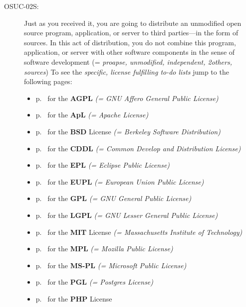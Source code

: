 \begin{description}
\item[OSUC-02S:]\label{OSUC-02S-DEF} Just as you received it, you are going to
distribute an unmodified open source program, application, or server to third
parties---in the form of sources. In this act of distribution, you do not
combine this program, application, or server with other software components in
the sense of software development (= \textit{proapse, unmodified, independent,
2others, sources}) To see the \textit{specific, license fulfilling to-do lists}
jump to the following pages:
   \begin{itemize}
    \item p.\ \pageref{OSUC-02S-AGPL} for the \textbf{AGPL}
      \textit{(= GNU Affero General Public License)} 
    \item p.\ \pageref{OSUC-02S-Apache20} for the \textbf{ApL}
      \textit{(= Apache License)}
    \item p.\ \pageref{OSUC-02S-BSD} for the \textbf{BSD} License
      \textit{(= Berkeley Software Distribution)}
    \item p.\ \pageref{OSUC-02S-CDDL} for the \textbf{CDDL}
      \textit{(= Common Develop and Distribution License)}  
    \item p.\ \pageref{OSUC-02S-EPL} for the \textbf{EPL}
      \textit{(= Eclipse Public License)}     
    \item p.\ \pageref{OSUC-02S-EUPL} for the \textbf{EUPL}
      \textit{(= European Union Public License)} 
    \item p.\ \pageref{OSUC-02S-GPL} for the \textbf{GPL}
       \textit{(= GNU General Public License)} 
    \item p.\ \pageref{OSUC-02S-LGPL} for the \textbf{LGPL}
      \textit{(= GNU Lesser General Public License)}           
    \item p.\ \pageref{OSUC-02S-MIT} for the \textbf{MIT} License
       \textit{(= Massachusetts Institute of Technology)} 
    \item p.\ \pageref{OSUC-02S-MPL} for the \textbf{MPL}
      \textit{(= Mozilla Public License)}     
    \item p.\ \pageref{OSUC-02S-MS-PL} for the \textbf{MS-PL}
      \textit{(= Microsoft Public License)} 
    \item p.\ \pageref{OSUC-02S-PGL} for the \textbf{PGL}
      \textit{(= Postgres License)} 
    \item p.\ \pageref{OSUC-02S-PHP} for the \textbf{PHP} License 
  \end{itemize}


\end{description}
